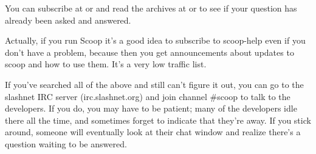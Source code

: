 You can subscribe at  or  and read the archives at  or  to see if your question has already been asked and answered.

Actually, if you run Scoop it's a good idea to subscribe to scoop-help even if you don't have a problem, because then you get announcements about updates to scoop and how to use them.  It's a very low traffic list.

If you've searched all of the above and still can't figure it out, you can go to the slashnet IRC server (irc.slashnet.org) and join channel \#scoop to talk to the developers.  If you do, you may have to be patient; many of the developers idle there all the time, and sometimes forget to indicate that they're away.  If you stick around, someone will eventually look at their chat window and realize there's a question waiting to be answered.

